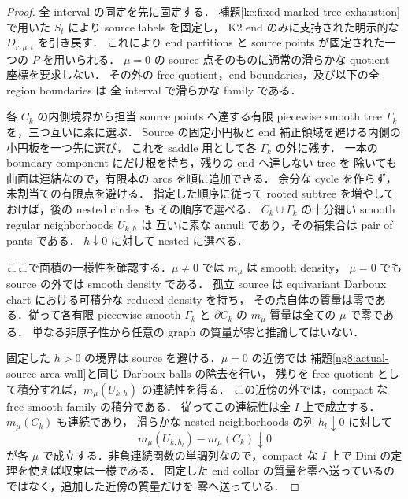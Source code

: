 \begin{proof}
全 interval の同定を先に固定する．
補題\ref{ke:fixed-marked-tree-exhaustion}で用いた $S_t$ により source labels を固定し，
K2 end のみに支持された明示的な $D_{r,\mu,t}$ を引き戻す．
これにより end partitions と source points が固定された一つの $P$ を用いられる．
$\mu=0$ の source 点そのものに通常の滑らかな quotient 座標を要求しない．
その外の free quotient，end boundaries，及び以下の全 region boundaries は
全 interval で滑らかな family である．

各 $C_k$ の内側境界から担当 source points へ達する有限 piecewise smooth tree
$\Gamma_k$ を，三つ互いに素に選ぶ．
Source の固定小円板と end 補正領域を避ける内側の小円板を一つ先に選び，
これを saddle 用として各 $\Gamma_k$ の外に残す．
一本の boundary component にだけ根を持ち，残りの end へ達しない tree を
除いても曲面は連結なので，有限本の arcs を順に追加できる．
余分な cycle を作らず，未割当ての有限点を避ける．
指定した順序に従って rooted subtree を増やしておけば，後の nested circles も
その順序で選べる．
$C_k\cup\Gamma_k$ の十分細い smooth regular neighborhoods $U_{k,h}$ は
互いに素な annuli であり，その補集合は pair of pants である．
$h\downarrow0$ に対して nested に選べる．

ここで面積の一様性を確認する．$\mu\ne0$ では $m_\mu$ は smooth density，
$\mu=0$ でも source の外では smooth density である．
孤立 source は equivariant Darboux chart における可積分な reduced density を持ち，
その点自体の質量は零である．従って各有限 piecewise smooth $\Gamma_k$ と
$\partial C_k$ の $m_\mu$-質量は全ての $\mu$ で零である．
単なる非原子性から任意の graph の質量が零と推論してはいない．

固定した $h>0$ の境界は source を避ける．$\mu=0$ の近傍では
補題\ref{ng8:actual-source-area-wall}と同じ Darboux balls の除去を行い，
残りを free quotient として積分すれば，$m_\mu(U_{k,h})$ の連続性を得る．
この近傍の外では，compact な free smooth family の積分である．
従ってこの連続性は全 $I$ 上で成立する．$m_\mu(C_k)$ も連続であり，
滑らかな nested neighborhoods の列 $h_l\downarrow0$ に対して
\[
 m_\mu(U_{k,h_l})-m_\mu(C_k)\downarrow0
\]
が各 $\mu$ で成立する．非負連続関数の単調列なので，compact な $I$ 上で
Dini の定理を使えば収束は一様である．
固定した end collar の質量を零へ送っているのではなく，追加した近傍の質量だけを
零へ送っている．


\end{proof}
